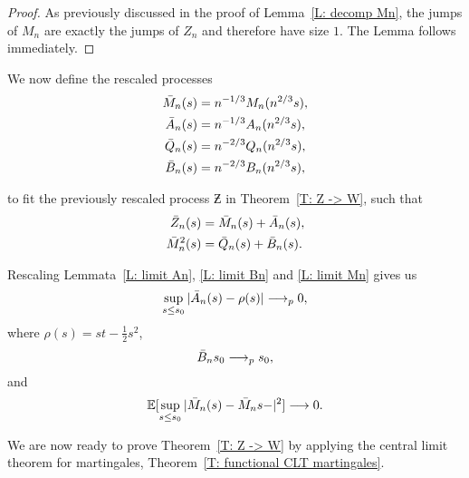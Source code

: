 \begin{proof} \label{P: limit Mn}
	As previously discussed in the proof of Lemma~\ref{L: decomp Mn}, 
	the jumps of $M_n$ are exactly the jumps of $Z_n$ and therefore have size $1$. 
	The Lemma follows immediately.
\end{proof}


We now define the rescaled processes 
\begin{equation}
\begin{aligned}
\bar{M}_n(s) &= n^{-1 / 3}M_n(n^{2 / 3}s), \\
\bar{A}_n(s) &= n^{-1 / 3}A_n(n^{2 / 3}s), \\
\bar{Q}_n(s) &= n^{-2 / 3}Q_n(n^{2 / 3}s), \\
\bar{B}_n(s) &= n^{-2 / 3}B_n(n^{2 / 3}s),
\end{aligned} 	
\end{equation}

to fit the previously rescaled process 
$\Zbar$ in Theorem~\ref{T: Z -> W}, such that
\begin{equation}
\begin{aligned}
\bar{Z}_n(s) &= \bar{M}_n(s) + \bar{A}_n(s), \\
\bar{M}_n^2(s) &= \bar{Q}_n(s) + \bar{B}_n(s).
\end{aligned}	
\end{equation}

Rescaling Lemmata~\ref{L: limit An}, \ref{L: limit Bn} and \ref{L: limit Mn} gives us
\begin{equation} \label{E: limit An rescaled}
\sup_{s \leq s_0} |\bar{A}_n(s) - \rho (s)| \longrightarrow_p 0,
\end{equation}
where $\rho (s) = st - \frac{1}{2}s^2$,
\begin{equation} \label{E: limit Bn rescaled}
\bar{B}_n{s_0} \longrightarrow_p s_0,
\end{equation}
and
\begin{equation} \label{E: limit Mn rescaled}
\mathbb{E}[\sup_{s \leq s_0} | \bar{M}_n(s) - \bar{M}_n{s-} |^2 ] \longrightarrow 0.
\end{equation}

We are now ready to prove Theorem~\ref{T: Z -> W} by applying the central limit theorem for martingales, Theorem~\ref{T: functional CLT martingales}.

